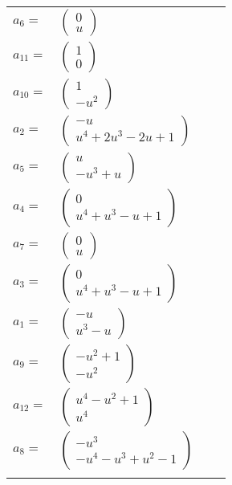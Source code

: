 \documentclass[1p]{elsarticle_modified}
\theoremstyle{definition}
\begin{document}
\begin{tabular}{m{7pt} m{180pt} m{7pt} m{180pt} }
\flushright $a_{6}=$&$\begin{pmatrix}0\\u\end{pmatrix}$ \\
\flushright $a_{11}=$&$\begin{pmatrix}1\\0\end{pmatrix}$ \\
\flushright $a_{10}=$&$\begin{pmatrix}1\\- u^2\end{pmatrix}$ \\
\flushright $a_{2}=$&$\begin{pmatrix}- u\\u^4+2 u^3-2 u+1\end{pmatrix}$ \\
\flushright $a_{5}=$&$\begin{pmatrix}u\\- u^3+u\end{pmatrix}$ \\
\flushright $a_{4}=$&$\begin{pmatrix}0\\u^4+u^3- u+1\end{pmatrix}$ \\
\flushright $a_{7}=$&$\begin{pmatrix}0\\u\end{pmatrix}$ \\
\flushright $a_{3}=$&$\begin{pmatrix}0\\u^4+u^3- u+1\end{pmatrix}$ \\
\flushright $a_{1}=$&$\begin{pmatrix}- u\\u^3- u\end{pmatrix}$ \\
\flushright $a_{9}=$&$\begin{pmatrix}- u^2+1\\- u^2\end{pmatrix}$ \\
\flushright $a_{12}=$&$\begin{pmatrix}u^4- u^2+1\\u^4\end{pmatrix}$ \\
\flushright $a_{8}=$&$\begin{pmatrix}- u^3\\- u^4- u^3+u^2-1\end{pmatrix}$\\&\end{tabular}
\end{document}
